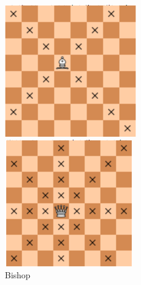 \documentclass{article}
\begin{document}
\begin{figure}[!htb]
%
  \includegraphics[width=\linewidth]{chess4}
  \caption{Bishop}\label{fig:chess4}
\endminipage\hfill
{}%
  \includegraphics[width=\linewidth]{chess5}

\end{figure}
\end{document}
